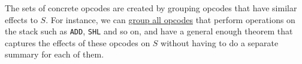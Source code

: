 The sets of concrete opcodes are created by grouping opcodes that have similar
effects to $S$.
For instance, we can
\href{https://runtimeverification.github.io/evm-equivalence/docs/EvmEquivalence/Summaries/StackOperationsSummary.html}{group
  all opcodes} that perform operations on the stack such as \texttt{ADD},
\texttt{SHL} and so on, and have a general enough theorem that captures the
effects of these opcodes on $S$ without having to do a separate summary for each
of them.
